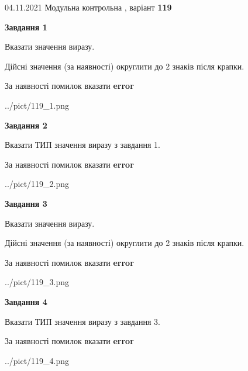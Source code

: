 \documentclass[11pt, ukrainian]{article}
\begin{document}
{04.11.2021 Модульна контрольна , варіант  \No \textbf { 119 }\par}
{
\begin {large}
{\begin {center}\textbf{Завдання 1}\end {center}}\par
Вказати значення виразу. \par
Дійсні значення (за наявності) округлити до 2 знаків після крапки. \par
За наявності помилок вказати \textbf{error}

\begin{center}
	{../pict/119_1.png}
\end{center}
\newpage

{\begin {center}\textbf{Завдання 2}\end {center}}\par
Вказати ТИП значення виразу з завдання 1. \par
За наявності помилок вказати \textbf{error}

\begin{center}
	{../pict/119_2.png}
\end{center}
\newpage

{\begin {center}\textbf{Завдання 3}\end {center}}\par
Вказати значення виразу. \par
Дійсні значення (за наявності) округлити до 2 знаків після крапки. \par
За наявності помилок вказати \textbf{error}

\begin{center}
	{../pict/119_3.png}
\end{center}
\newpage

{\begin {center}\textbf{Завдання 4}\end {center}}\par
Вказати ТИП значення виразу з завдання 3. \par
За наявності помилок вказати \textbf{error}

\begin{center}
	{../pict/119_4.png}
\end{center}
\newpage


\end{large}}
\end{document}
